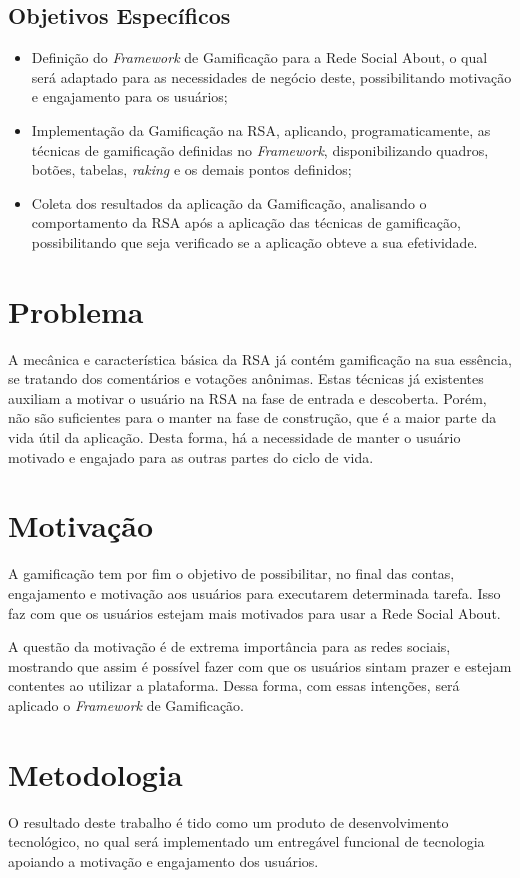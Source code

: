 \subsection{Objetivos Específicos}
\begin{itemize}
    \item Definição do \textit{Framework} de Gamificação para a Rede Social About,
        o qual será adaptado para as necessidades de negócio deste, possibilitando
        motivação e engajamento para os usuários;
    \item Implementação da Gamificação na RSA, aplicando, programaticamente, as técnicas
        de gamificação definidas no \textit{Framework}, disponibilizando quadros, botões,
        tabelas, \textit{raking} e os demais pontos definidos;
    \item Coleta dos resultados da aplicação da Gamificação, analisando o comportamento da
        RSA após a aplicação das técnicas de gamificação, possibilitando que seja verificado
        se a aplicação obteve a sua efetividade.
\end{itemize}
\section{Problema}
A mecânica e característica básica da RSA já contém gamificação na sua essência, se tratando dos comentários e votações anônimas.
Estas técnicas já existentes auxiliam a motivar o usuário na RSA na fase de
entrada e descoberta. Porém, não são suficientes para o manter na fase de
construção, que é a maior parte da vida útil da aplicação. Desta forma, há
a necessidade de manter o usuário motivado e engajado para as outras partes
do ciclo de vida.
\section{Motivação}
A gamificação tem por fim o objetivo de 
possibilitar, no final das contas, engajamento e motivação aos usuários para
executarem determinada tarefa. Isso faz com que os usuários estejam mais
motivados para usar a Rede Social About. 

A questão da motivação é de extrema importância para as redes sociais, mostrando
que assim é possível fazer com que os usuários sintam prazer e estejam
contentes ao utilizar a plataforma. Dessa forma, com essas intenções,
será aplicado o \textit{Framework} de Gamificação.

\section{Metodologia}
O resultado deste trabalho é tido como um produto de desenvolvimento tecnológico, no qual será implementado
um entregável funcional de tecnologia apoiando a motivação e engajamento dos usuários.

